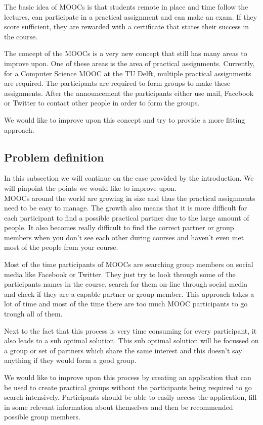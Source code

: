 \documentclass[]{article}
\begin{document}
The basic idea of MOOCs is that students remote in place and time follow the lectures, can participate in a practical assignment and can make an exam.
If they score sufficient, they are rewarded with a certificate that states their success in the course.

The concept of the MOOCs is a very new concept that still has many areas to improve upon.
One of these areas is the area of practical assignments.
Currently, for a Computer Science MOOC at the TU Delft, multiple practical assignments are required.
The participants are required to form groups to make these assignments.
After the announcement the participants either use mail, Facebook or  Twitter to contact other people in order to form the groups.

We would like to improve upon this concept and try to provide a more fitting approach.

\subsection{Problem definition}
In this subsection we will continue on the case provided by the introduction.
We will pinpoint the points we would like to improve upon.\\

MOOCs around the world are growing in size and thus the practical assignments need to be easy to manage.
The growth also means that it is more difficult for each participant to find a possible practical partner due to the large amount of people.
It also becomes really difficult to find the correct partner or group members when you don't see each other during courses and haven't even met most of the people from your course.

Most of the time participants of MOOCs are searching group members on social media like Facebook or Twitter.
They just try to look through some of the participants names in the course, search for them on-line through social media and check if they are a capable partner or group member.
This approach takes a lot of time and most of the time there are too much MOOC participants to go trough all of them.

Next to the fact that this process is very time consuming for every participant, it also leads to a sub optimal solution.
This sub optimal solution will be focussed on a group or set of partners which share the same interest and this doesn't say anything if they would form a good group.

We would like to improve upon this process by creating an application that can be used to create practical groups without the participants being required to go search intensively.
Participants should be able to easily access the application, fill in some relevant information about themselves and then be recommended possible group members.
\end{document}

